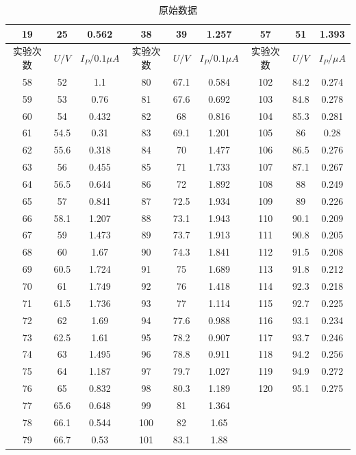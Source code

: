 \documentclass[a4paper,UTF8]{ctexart}
\begin{document}
\begin{table}[H]
\begin{tabular}{|c|c|c|c|c|c|c|c|c|}
        19 & 25 & 0.562 & 38 & 39 & 1.257 & 57 & 51 & 1.393 \\ \hline
        实验次数 & $U/V$ & $I_{P}/0.1 \mu A$ & 实验次数 & $U/V$ & $I_{P}/0.1 \mu A$ & 实验次数 & $U/V$ & $I_{P}/ \mu A$ \\ \hline
        58 & 52 & 1.1 & 80 & 67.1 & 0.584 & 102 & 84.2 & 0.274 \\ \hline
        59 & 53 & 0.76 & 81 & 67.6 & 0.692 & 103 & 84.8 & 0.278 \\ \hline
        60 & 54 & 0.432 & 82 & 68 & 0.816 & 104 & 85.3 & 0.281 \\ \hline
        61 & 54.5 & 0.31 & 83 & 69.1 & 1.201 & 105 & 86 & 0.28 \\ \hline
        62 & 55.6 & 0.318 & 84 & 70 & 1.477 & 106 & 86.5 & 0.276 \\ \hline
        63 & 56 & 0.455 & 85 & 71 & 1.733 & 107 & 87.1 & 0.267 \\ \hline
        64 & 56.5 & 0.644 & 86 & 72 & 1.892 & 108 & 88 & 0.249 \\ \hline
        65 & 57 & 0.841 & 87 & 72.5 & 1.934 & 109 & 89 & 0.226 \\ \hline
        66 & 58.1 & 1.207 & 88 & 73.1 & 1.943 & 110 & 90.1 & 0.209 \\ \hline
        67 & 59 & 1.473 & 89 & 73.7 & 1.913 & 111 & 90.8 & 0.205 \\ \hline
        68 & 60 & 1.67 & 90 & 74.3 & 1.841 & 112 & 91.5 & 0.208 \\ \hline
        69 & 60.5 & 1.724 & 91 & 75 & 1.689 & 113 & 91.8 & 0.212 \\ \hline
        70 & 61 & 1.749 & 92 & 76 & 1.418 & 114 & 92.3 & 0.218 \\ \hline
        71 & 61.5 & 1.736 & 93 & 77 & 1.114 & 115 & 92.7 & 0.225 \\ \hline
        72 & 62 & 1.69 & 94 & 77.6 & 0.988 & 116 & 93.1 & 0.234 \\ \hline
        73 & 62.5 & 1.61 & 95 & 78.2 & 0.907 & 117 & 93.7 & 0.246 \\ \hline
        74 & 63 & 1.495 & 96 & 78.8 & 0.911 & 118 & 94.2 & 0.256 \\ \hline
        75 & 64 & 1.187 & 97 & 79.7 & 1.027 & 119 & 94.9 & 0.272 \\ \hline
        76 & 65 & 0.832 & 98 & 80.3 & 1.189 & 120 & 95.1 & 0.275 \\ \hline
        77 & 65.6 & 0.648 & 99 & 81 & 1.364 & ~ & ~ & ~ \\ \hline
        78 & 66.1 & 0.544 & 100 & 82 & 1.65 & ~ & ~ & ~ \\ \hline
        79 & 66.7 & 0.53 & 101 & 83.1 & 1.88 & ~ & ~ & ~ \\ \hline
    \end{tabular}
    \caption{原始数据}
\end{table}
\end{document}
